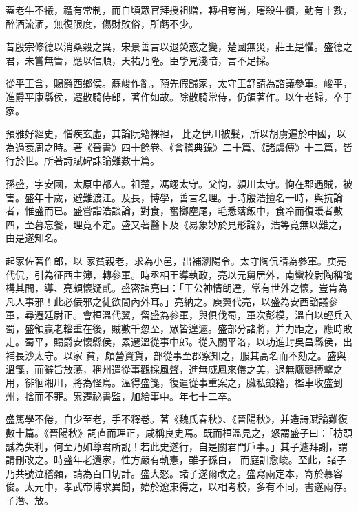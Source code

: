 \begin{pinyinscope}
 蓋老牛不犧，禮有常制，而自頃眾官拜授祖贈，轉相夸尚，屠殺牛犢，動有十數，醉酒流湎，無復限度，傷財敗俗，所虧不少。



 昔殷宗修德以消桑穀之異，宋景善言以退熒惑之變，楚國無災，莊王是懼。盛德之君，未嘗無眚，應以信順，天祐乃隆。臣學見淺暗，言不足採。



 從平王含，賜爵西鄉侯。蘇峻作亂，預先假歸家，太守王舒請為諮議參軍。峻平，進爵平康縣侯，遷散騎侍郎，著作如故。除散騎常侍，仍領著作。以年老歸，卒于家。



 預雅好經史，憎疾玄虛，其論阮籍裸袒，
 比之伊川被髮，所以胡虜遍於中國，以為過衰周之時。著《晉書》四十餘卷、《會稽典錄》二十篇、《諸虞傳》十二篇，皆行於世。所著詩賦碑誄論難數十篇。



 孫盛，字安國，太原中都人。祖楚，馮翊太守。父恂，潁川太守。恂在郡遇賊，被害。盛年十歲，避難渡江。及長，博學，善言名理。于時殷浩擅名一時，與抗論者，惟盛而已。盛嘗詣浩談論，對食，奮擲麈尾，毛悉落飯中，食冷而復暖者數四，至暮忘餐，理竟不定。盛又著醫卜及《易象妙於見形論》，浩等竟無以難之，由是遂知名。



 起家佐著作郎，以
 家貧親老，求為小邑，出補瀏陽令。太守陶侃請為參軍。庾亮代侃，引為征西主簿，轉參軍。時丞相王導執政，亮以元舅居外，南蠻校尉陶稱讒構其間，導、亮頗懷疑貳。盛密諫亮曰：「王公神情朗達，常有世外之懷，豈肯為凡人事邪！此必佞邪之徒欲間內外耳。」亮納之。庾翼代亮，以盛為安西諮議參軍，尋遷廷尉正。會桓溫代翼，留盛為參軍，與俱伐蜀，軍次彭模，溫自以輕兵入蜀，盛領贏老輜重在後，賊數千忽至，眾皆遑遽。盛部分諸將，并力距之，應時敗走。蜀平，賜爵安懷縣侯，累遷溫從事中郎。從入關平洛，以功進封吳昌縣侯，出補長沙太守。以家
 貧，頗營資貨，部從事至郡察知之，服其高名而不劾之。盛與溫箋，而辭旨放蕩，稱州遣從事觀採風聲，進無威鳳來儀之美，退無鷹鸇搏擊之用，徘徊湘川，將為怪鳥。溫得盛箋，復遣從事重案之，臟私鋃籍，檻車收盛到州，捨而不罪。累遷祕書監，加給事中。年七十二卒。



 盛篤學不倦，自少至老，手不釋卷。著《魏氏春秋》、《晉陽秋》，并造詩賦論難復數十篇。《晉陽秋》詞直而理正，咸稱良史焉。既而桓溫見之，怒謂盛子曰：「枋頭誠為失利，何至乃如尊君所說！若此史遂行，自是關君門戶事。」其子遽拜謝，謂請刪改之。時盛年老還家，性方嚴有軌憲，雖子孫白，
 而庭訓愈峻。至此，諸子乃共號泣稽顙，請為百口切計。盛大怒。諸子遂爾改之。盛寫兩定本，寄於慕容俊。太元中，孝武帝博求異聞，始於遼東得之，以相考校，多有不同，書遂兩存。子潛、放。




\end{pinyinscope}
